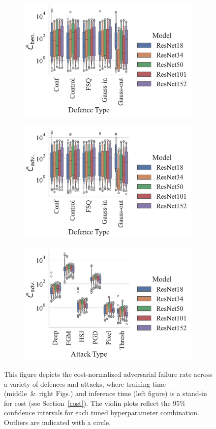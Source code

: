 \begin{figure}[!h]
    \centering
    \begin{subfigure}
        \centering
        \includegraphics[width=.42\textwidth]{plots/ben_failures_per_train_time_vs_defence_type.pdf}
    \end{subfigure}
    \begin{subfigure}
        \centering
        \includegraphics[width=.42\textwidth]{plots/adv_failures_per_train_time_vs_defence_type.pdf}
    \end{subfigure}
    \begin{subfigure}
        \centering
        \includegraphics[width=.42\textwidth]{plots/adv_failures_per_train_time_vs_attack_type.pdf}
    \end{subfigure}
    \caption{This figure depicts the cost-normalized adversarial failure rate across a variety of defences and attacks, where training time (middle~\&~right Figs.) and inference time (left figure) is a stand-in for cost (see Section~\ref{cost}). The violin plots reflect the 95\% confidence intervals for each tuned hyperparameter combination. Outliers are indicated with a circle.}
    \label{fig:failures_per_train_time}
\end{figure}